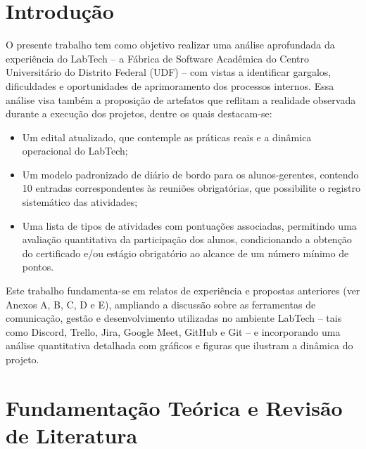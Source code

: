 
\chapter{Introdução}
\label{sec:introducao}

O presente trabalho tem como objetivo realizar uma análise aprofundada da experiência do LabTech – a Fábrica de Software Acadêmica do Centro Universitário do Distrito Federal (UDF) – com vistas a identificar gargalos, dificuldades e oportunidades de aprimoramento dos processos internos. Essa análise visa também a proposição de artefatos que reflitam a realidade observada durante a execução dos projetos, dentre os quais destacam-se:

\begin{itemize}[label=\textbullet]
    \item Um edital atualizado, que contemple as práticas reais e a dinâmica operacional do LabTech;
    \item Um modelo padronizado de diário de bordo para os alunos-gerentes, contendo 10 entradas correspondentes às reuniões obrigatórias, que possibilite o registro sistemático das atividades;
    \item Uma lista de tipos de atividades com pontuações associadas, permitindo uma avaliação quantitativa da participação dos alunos, condicionando a obtenção do certificado e/ou estágio obrigatório ao alcance de um número mínimo de pontos.
\end{itemize}

Este trabalho fundamenta-se em relatos de experiência e propostas anteriores (ver Anexos A, B, C, D e E), ampliando a discussão sobre as ferramentas de comunicação, gestão e desenvolvimento utilizadas no ambiente LabTech – tais como Discord, Trello, Jira, Google Meet, GitHub e Git – e incorporando uma análise quantitativa detalhada com gráficos e figuras que ilustram a dinâmica do projeto.


\chapter{Fundamentação Teórica e Revisão de Literatura}
\label{chap:fundamentacao_literatura}

